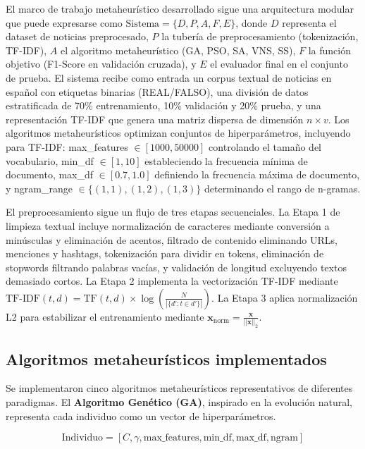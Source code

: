 El marco de trabajo metaheurístico desarrollado sigue una arquitectura modular que puede expresarse como $\text{Sistema} = \{D, P, A, F, E\}$, donde $D$ representa el dataset de noticias preprocesado, $P$ la tubería de preprocesamiento (tokenización, TF-IDF), $A$ el algoritmo metaheurístico (GA, PSO, SA, VNS, SS), $F$ la función objetivo (F1-Score en validación cruzada), y $E$ el evaluador final en el conjunto de prueba. El sistema recibe como entrada un corpus textual de noticias en español con etiquetas binarias (REAL/FALSO), una división de datos estratificada de 70\% entrenamiento, 10\% validación y 20\% prueba, y una representación TF-IDF que genera una matriz dispersa de dimensión $n \times v$. Los algoritmos metaheurísticos optimizan conjuntos de hiperparámetros, incluyendo para TF-IDF: max\_features $\in [1000, 50000]$ controlando el tamaño del vocabulario, min\_df $\in [1, 10]$ estableciendo la frecuencia mínima de documento, max\_df $\in [0.7, 1.0]$ definiendo la frecuencia máxima de documento, y ngram\_range $\in \{(1,1), (1,2), (1,3)\}$ determinando el rango de n-gramas.

El preprocesamiento sigue un flujo de tres etapas secuenciales. La Etapa 1 de limpieza textual incluye normalización de caracteres mediante conversión a minúsculas y eliminación de acentos, filtrado de contenido eliminando URLs, menciones y hashtags, tokenización para dividir en tokens, eliminación de stopwords filtrando palabras vacías, y validación de longitud excluyendo textos demasiado cortos. La Etapa 2 implementa la vectorización TF-IDF mediante $\text{TF-IDF}(t,d) = \text{TF}(t,d) \times \log\left(\frac{N}{|\{d' : t \in d'\}|}\right)$. La Etapa 3 aplica normalización L2 para estabilizar el entrenamiento mediante $\mathbf{x}_{\text{norm}} = \frac{\mathbf{x}}{||\mathbf{x}||_2}$.

\subsection{Algoritmos metaheurísticos implementados}

Se implementaron cinco algoritmos metaheurísticos representativos de diferentes paradigmas. 
El \textbf{Algoritmo Genético (GA)}, inspirado en la evolución natural, representa cada individuo como un vector de hiperparámetros.



\[
\text{Individuo} = [C, \gamma, \text{max\_features}, \text{min\_df}, \text{max\_df}, \text{ngram}]
\]



